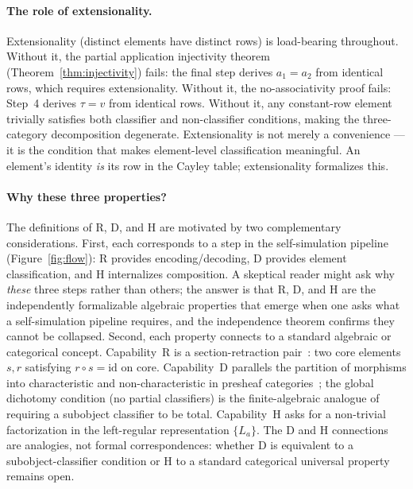 \documentclass[sigconf,screen]{acmart}
\theoremstyle{remark}
\begin{document}
\paragraph{The role of extensionality.}
Extensionality (distinct elements have distinct rows) is load-bearing throughout. Without it, the partial application injectivity theorem (Theorem~\ref{thm:injectivity}) fails: the final step derives $a_1 = a_2$ from identical rows, which requires extensionality. Without it, the no-associativity proof fails: Step~4 derives $\tau = v$ from identical rows. Without it, any constant-row element trivially satisfies both classifier and non-classifier conditions, making the three-category decomposition degenerate. Extensionality is not merely a convenience --- it is the condition that makes element-level classification meaningful. An element's identity \emph{is} its row in the Cayley table; extensionality formalizes this.

\paragraph{Why these three properties?}
The definitions of R, D, and H are motivated by two complementary considerations. First, each corresponds to a step in the self-simulation pipeline (Figure~\ref{fig:flow}): R provides encoding/decoding, D provides element classification, and H internalizes composition. A skeptical reader might ask why \emph{these} three steps rather than others; the answer is that R, D, and H are the independently formalizable algebraic properties that emerge when one asks what a self-simulation pipeline requires, and the independence theorem confirms they cannot be collapsed. Second, each property connects to a standard algebraic or categorical concept. Capability~R is a section-retraction pair~\cite{maclane71}: two core elements $s, r$ satisfying $r \circ s = \mathrm{id}$ on core. Capability~D parallels the partition of morphisms into characteristic and non-characteristic in presheaf categories~\cite{johnstone02}; the global dichotomy condition (no partial classifiers) is the finite-algebraic analogue of requiring a subobject classifier to be total. Capability~H asks for a non-trivial factorization in the left-regular representation $\{L_a\}$. The D and H connections are analogies, not formal correspondences: whether D is equivalent to a subobject-classifier condition or H to a standard categorical universal property remains open.
\end{document}
